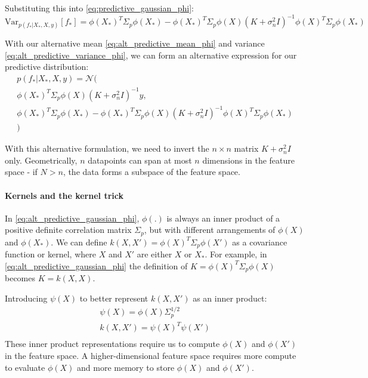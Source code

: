  Substituting this into \ref{eq:predictive_gaussian_phi}:
\begin{equation} \label{eq:alt_predictive_variance_phi}
    \text{Var}_{p(f_*|X_*,X,y)}[f_*] = \phi(X_*)^T\Sigma_p\phi(X_*) - \phi(X_*)^T\Sigma_p\phi(X)(K+\sigma_n^2I)^{-1}\phi(X)^T\Sigma_p\phi(X_*)
\end{equation}

With our alternative mean \ref{eq:alt_predictive_mean_phi} and variance \ref{eq:alt_predictive_variance_phi}, we can form an alternative expression for our predictive distribution:
\begin{equation} \label{eq:alt_predictive_gaussian_phi}
    \begin{aligned}
        p(f_*|X_*,X,y) = \mathcal{N}( \\
        \phi(X_*)^T\Sigma_p\phi(X)(K+\sigma_n^2I)^{-1}y , \\
        \phi(X_*)^T\Sigma_p\phi(X_*) - \phi(X_*)^T\Sigma_p\phi(X)(K+\sigma_n^2I)^{-1}\phi(X)^T\Sigma_p\phi(X_*) \\
        )
    \end{aligned}
\end{equation}

With this alternative formulation, we need to invert the $n \times n$ matrix $K + \sigma_n^2I$ only. Geometrically, $n$ datapoints can span at most $n$ dimensions in the feature space - if $N > n$, the data forms a subspace of the feature space.

\paragraph{Kernels and the kernel trick}
In \ref{eq:alt_predictive_gaussian_phi}, $\phi(.)$ is always an inner product of a positive definite correlation matrix $\Sigma_p$, but with different arrangements of $\phi(X)$ and $\phi(X_*)$. We can define $k(X,X') = \phi(X)^T\Sigma_p\phi(X')$ as a covariance function or kernel, where $X$ and $X'$ are either $X$ or $X_*$. For example, in \ref{eq:alt_predictive_gaussian_phi} the definition of $K = \phi(X)^T\Sigma_p\phi(X)$ becomes $K = k(X,X)$.

Introducing $\psi(X)$ to better represent $k(X,X')$ as an inner product:
\begin{equation*}
    \begin{aligned}
        \psi(X) = \phi(X)\Sigma_p^{1/2} \\
        k(X,X') = \psi(X)^T\psi(X') \\
    \end{aligned}
\end{equation*}
These inner product representations require us to compute $\phi(X)$ and $\phi(X')$ in the feature space. A higher-dimensional feature space requires more compute to evaluate $\phi(X)$ and more memory to store $\phi(X)$ and $\phi(X')$.

